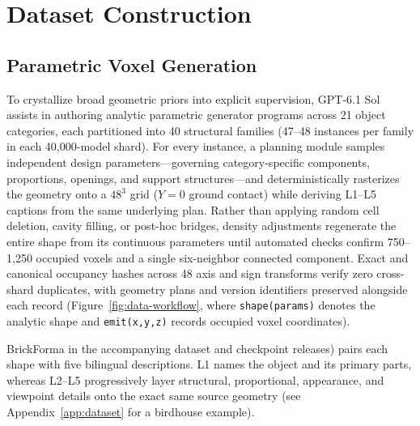 \documentclass[letterpaper]{article} %
\begin{document}

\section{Dataset Construction}
\label{sec:dataset}
\subsection{Parametric Voxel Generation}
To crystallize broad geometric priors into explicit supervision, GPT-6.1 Sol assists in authoring analytic parametric generator programs across 21 object categories, each partitioned into 40 structural families (47--48 instances per family in each 40,000-model shard). For every instance, a planning module samples independent design parameters---governing category-specific components, proportions, openings, and support structures---and deterministically rasterizes the geometry onto a $48^3$ grid ($Y{=}0$ ground contact) while deriving L1--L5 captions from the same underlying plan. Rather than applying random cell deletion, cavity filling, or post-hoc bridges, density adjustments regenerate the entire shape from its continuous parameters until automated checks confirm 750--1,250 occupied voxels and a single six-neighbor connected component. Exact and canonical occupancy hashes across 48 axis and sign transforms verify zero cross-shard duplicates, with geometry plans and version identifiers preserved alongside each record (Figure~\ref{fig:data-workflow}, where \texttt{shape(params)} denotes the analytic shape and \texttt{emit(x,y,z)} records occupied voxel coordinates).

BrickForma%
in the accompanying dataset and checkpoint releases) pairs each shape with five bilingual descriptions. L1 names the object and its primary parts, whereas L2--L5 progressively layer structural, proportional, appearance, and viewpoint details onto the exact same source geometry (see Appendix~\ref{app:dataset} for a birdhouse example).
\end{document}
